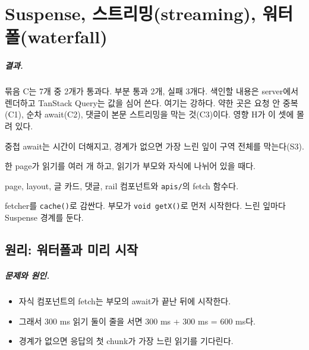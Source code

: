 \chapter{Suspense, 스트리밍(streaming), 워터폴(waterfall)}\label{ch:suspense}

\paragraph{결과.}
묶음 C는 7개 중 2개가 통과다. 부분 통과 2개, 실패 3개다.
색인할 내용은 server에서 렌더하고 TanStack Query는 값을 심어 쓴다. 여기는 강하다.
약한 곳은 요청 안 중복(C1), 순차 await(C2), 댓글이 본문 스트리밍을 막는 것(C3)이다.
영향 H가 이 셋에 몰려 있다.

\begin{inbrief}
  \item[Why] 중첩 await는 시간이 더해지고, 경계가 없으면 가장 느린 잎이 구역 전체를 막는다(S3).
  \item[When] 한 page가 읽기를 여러 개 하고, 읽기가 부모와 자식에 나뉘어 있을 때다.
  \item[Where] page, layout, 글 카드, 댓글, rail 컴포넌트와 \texttt{apis/}의 fetch 함수다.
  \item[How] fetcher를 \texttt{cache()}로 감싼다. 부모가 \texttt{void getX()}로 먼저 시작한다. 느린 잎마다 Suspense 경계를 둔다.
\end{inbrief}

\section{원리: 워터폴과 미리 시작}\label{sec:su-principle}

\paragraph{문제와 원인.}
\begin{itemize}[nosep]
  \item 자식 컴포넌트의 fetch는 부모의 await가 끝난 뒤에 시작한다.
  \item 그래서 300 ms 읽기 둘이 줄을 서면 300 ms + 300 ms = 600 ms다.
  \item 경계가 없으면 응답의 첫 chunk가 가장 느린 읽기를 기다린다.
\end{itemize}

